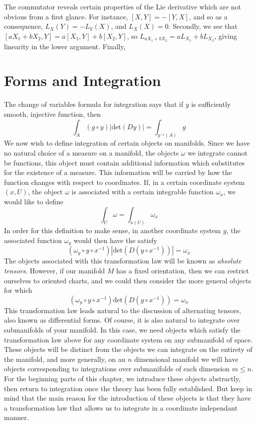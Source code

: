 The commutator reveals certain properties of the Lie derivative which are not obvious from a first glance. For instance, $[X,Y] = -[Y,X]$, and so as a consequence, $L_X(Y) = -L_Y(X)$, and $L_X(X) = 0$. Secondly, we see that $[aX_1 + bX_2,Y] = a[X_1,Y] + b[X_2,Y]$, so $L_{aX_1 + bX_2} = aL_{X_1} + bL_{X_2}$, giving linearity in the lower argument. Finally,

\chapter{Forms and Integration}

The change of variables formula for integration says that if $y$ is sufficiently smooth, injective function, then
%
\[ \int_A (g \circ y) |\text{det}(Dy)| = \int_{y^{-1}(A)} g \]
%
We now wish to define integration of certain objects on manifolds. Since we have no natural choice of a measure on a manifold, the objects $\omega$ we integrate cannot be functions, this object must contain additional information which substitutes for the existence of a measure. This information will be carried by how the function changes with respect to coordinates. If, in a certain coordinate system $(x,U)$, the object $\omega$ is associated with a certain integrable function $\omega_x$, we would like to define
%
\[ \int_U \omega = \int_{x(U)} \omega_x \]
%
In order for this definition to make sense, in another coordinate system $y$, the associated function $\omega_y$ would then have the satisfy
%
\[ (\omega_y \circ y \circ x^{-1}) |\text{det}(D(y \circ x^{-1}))| = \omega_x \]
%
The objects associated with this transformation law will be known as {\it absolute tensors}. However, if our manifold $M$ has a fixed orientation, then we can restrict ourselves to oriented charts, and we could then consider the more general objects for which
%
\[ (\omega_y \circ y \circ x^{-1}) \text{det}(D(y \circ x^{-1})) = \omega_x \]
%
This transformation law leads natural to the discussion of alternating tensors, also known as differential forms. Of course, it is also natural to integrate over submanifolds of your manifold. In this case, we need objects which satisfy the transformation law above for any coordinate system on any submanifold of space. These objects will be distinct from the objects we can integrate on the entirety of the manifold, and more generally, on an $n$ dimensional manifold we will have objects corresponding to integrations over submanifolds of each dimension $m \leq n$. For the beginning parts of this chapter, we introduce these objects abstractly, then return to integration once the theory has been fully established. But keep in mind that the main reason for the introduction of these objects is that they have a transformation law that allows us to integrate in a coordinate independant manner.


